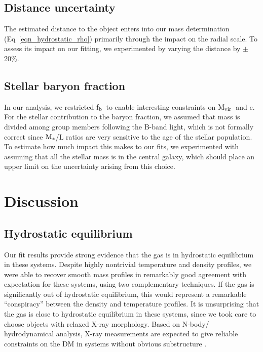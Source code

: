 \documentclass{emulateapj}
\newcommand{\mvir}{${\rm M_{vir}}$}
\newcommand{\mstars}{${\rm M_{*}}$}
\newcommand{\fbaryons}{${\rm f_{b}}$}
\begin{document}
\subsection{Distance uncertainty}
The estimated distance to the object enters into our mass determination
(Eq~\ref{eqn_hydrostatic_rho}) primarily through the impact on the 
radial scale.
To assess its impact on our fitting,
we experimented by varying the distance by $\pm$20\%.

\subsection{Stellar baryon fraction} \label{sect_systematics_baryon_fraction}
In our analysis, we restricted \fbaryons\ to enable interesting 
constraints on \mvir\ and c. For the stellar contribution to the 
baryon fraction, we assumed that mass is divided among group members
following the B-band light, which is not formally correct since
\mstars/L ratios are very sensitive to the age of the stellar 
population. To estimate how much impact this makes to our fits,
we experimented with assuming that all the stellar mass is in the central
galaxy, which should place an upper limit on the uncertainty
arising from this choice.

\section{Discussion} \label{sect_discussion}
\subsection{Hydrostatic equilibrium}
Our fit results provide strong evidence that the gas is in
hydrostatic equilibrium in these systems. Despite highly
nontrivial temperature and density profiles, we were able to recover
smooth mass profiles in remarkably good agreement with
expectation for these systems, using two complementary
techniques. If the gas is significantly out of 
hydrostatic equilibrium, this would represent a remarkable 
``conspiracy'' between the density and temperature profiles. 
It is unsurprising that the gas is close to hydrostatic equilibrium
in these systems, since we took care to choose objects with relaxed
X-ray morphology. Based on N-body/ hydrodynamical analysis,
X-ray measurements are expected to give reliable constraints 
on the DM in systems without obvious substructure
\citep{buote95a}.
\end{document}

